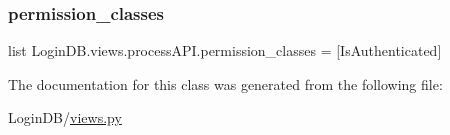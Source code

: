 \mbox{\label{class_login_d_b_1_1views_1_1process_a_p_i_a0e1bfc642be133c0206645511cbfc8b2}} 
\subsubsection{\texorpdfstring{permission\+\_\+classes}{permission\_classes}}
{\footnotesize\ttfamily list Login\+D\+B.\+views.\+process\+A\+P\+I.\+permission\+\_\+classes = \mbox{[}Is\+Authenticated\mbox{]}\hspace{0.3cm}{\ttfamily [static]}}



The documentation for this class was generated from the following file\+:\begin{DoxyCompactItemize}
\item 
Login\+D\+B/\hyperlink{views_8py}{views.\+py}\end{DoxyCompactItemize}

